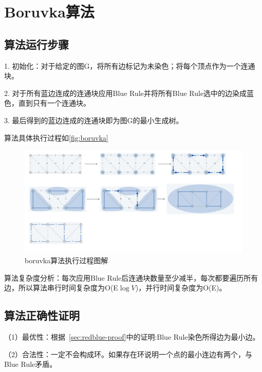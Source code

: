 \section{Boruvka算法}
\subsection{算法运行步骤}
1. 初始化：对于给定的图G，将所有边标记为未染色；将每个顶点作为一个连通块。

2. 对于所有蓝边连成的连通块应用Blue Rule并将所有Blue Rule选中的边染成蓝色，直到只有一个连通块。

3. 最后得到的蓝边连成的连通块即为图G的最小生成树。

算法具体执行过程如\autoref{fig:boruvka}
\begin{figure}[h]
	\centering
	\includegraphics[scale=0.4]{image/boruvka.png}
  \caption{boruvka算法执行过程图解}\label{fig:boruvka}
\end{figure}

算法复杂度分析：每次应用Blue Rule后连通块数量至少减半，每次都要遍历所有边，所以算法串行时间复杂度为O(E$\log V$)，并行时间复杂度为O(E)。

\subsection{算法正确性证明}
\noindent（1）最优性：根据~\ref{sec:redblue-proof}中的证明:Blue Rule染色所得边为最小边。

\noindent（2）合法性：一定不会构成环。如果存在环说明一个点的最小连边有两个，与Blue Rule矛盾。
